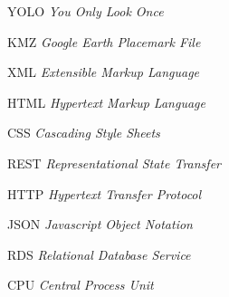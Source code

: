 \begin{siglas}
	\item[YOLO] \textit{You Only Look Once}
	\item[KMZ] \textit{Google Earth Placemark File} 
	\item[XML]  \textit{Extensible Markup Language} 
	\item[HTML] \textit{Hypertext Markup Language} 
	\item[CSS] \textit{Cascading Style Sheets}
	\item[REST] \textit{Representational State Transfer}
	\item[HTTP] \textit{Hypertext Transfer Protocol}
	\item[JSON]  \textit{Javascript Object Notation}     
	\item[RDS] \textit{Relational Database Service}  
	\item[CPU] \textit{Central Process Unit}  
\end{siglas}
